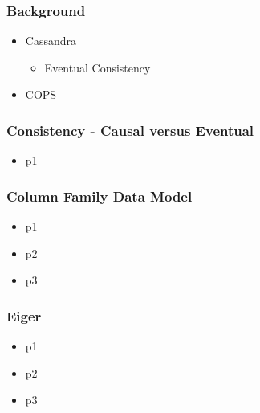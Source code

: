 \documentclass{beamer}
\begin{document}
\begin{frame}
\frametitle{Background}
\begin{itemize}
\pause \item Cassandra
	\begin{itemize}
		\item Eventual Consistency
	\end{itemize}
\pause \item COPS
\end{itemize}  
\end{frame}

\begin{frame}
\frametitle{Consistency - Causal versus Eventual}
\begin{itemize}
\pause \item p1	
\end{itemize}  
\end{frame}

\begin{frame}
\frametitle{Column Family Data Model}
\begin{itemize}
\pause \item p1 %
\pause \item p2
\pause \item p3
\end{itemize}  
\end{frame}



\begin{frame}
\frametitle{Eiger}
\begin{itemize}
\pause \item p1 %
\pause \item p2
\pause \item p3
\end{itemize}  
\end{frame}
\end{document}
